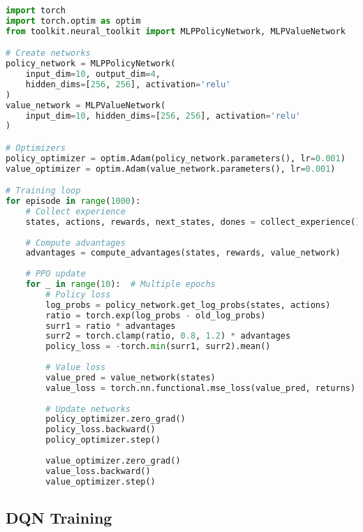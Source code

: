 \begin{lstlisting}[language=python, caption=PPO Training Example]
import torch
import torch.optim as optim
from toolkit.neural_toolkit import MLPPolicyNetwork, MLPValueNetwork

# Create networks
policy_network = MLPPolicyNetwork(
    input_dim=10, output_dim=4,
    hidden_dims=[256, 256], activation='relu'
)
value_network = MLPValueNetwork(
    input_dim=10, hidden_dims=[256, 256], activation='relu'
)

# Optimizers
policy_optimizer = optim.Adam(policy_network.parameters(), lr=0.001)
value_optimizer = optim.Adam(value_network.parameters(), lr=0.001)

# Training loop
for episode in range(1000):
    # Collect experience
    states, actions, rewards, next_states, dones = collect_experience()
    
    # Compute advantages
    advantages = compute_advantages(states, rewards, value_network)
    
    # PPO update
    for _ in range(10):  # Multiple epochs
        # Policy loss
        log_probs = policy_network.get_log_probs(states, actions)
        ratio = torch.exp(log_probs - old_log_probs)
        surr1 = ratio * advantages
        surr2 = torch.clamp(ratio, 0.8, 1.2) * advantages
        policy_loss = -torch.min(surr1, surr2).mean()
        
        # Value loss
        value_pred = value_network(states)
        value_loss = torch.nn.functional.mse_loss(value_pred, returns)
        
        # Update networks
        policy_optimizer.zero_grad()
        policy_loss.backward()
        policy_optimizer.step()
        
        value_optimizer.zero_grad()
        value_loss.backward()
        value_optimizer.step()
\end{lstlisting}

\subsection{DQN Training}

